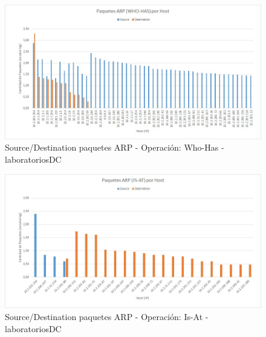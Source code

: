 \begin{figure}[h!]
\centering
\includegraphics[width=\textwidth]{./img/arp_whoHas_laboDC.jpg}
\caption{Source/Destination paquetes ARP - Operación: Who-Has - laboratoriosDC}
\end{figure}

\begin{figure}[h!]
\centering
\includegraphics[width=\textwidth]{./img/arp_isAt_laboDC.jpg}
\caption{Source/Destination paquetes ARP - Operación: Is-At - laboratoriosDC}
\end{figure}
